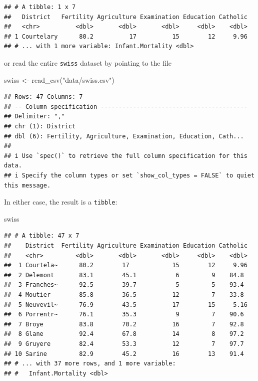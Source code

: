 \documentclass[
  12pt,
]{style/krantz}
\newenvironment{Shaded}{\begin{snugshade}}{\end{snugshade}}
\newcommand{\FunctionTok}[1]{\textcolor[rgb]{0.00,0.00,0.00}{#1}}
\newcommand{\NormalTok}[1]{#1}
\newcommand{\OtherTok}[1]{\textcolor[rgb]{0.56,0.35,0.01}{#1}}
\newcommand{\StringTok}[1]{\textcolor[rgb]{0.31,0.60,0.02}{#1}}
\begin{document}
\begin{verbatim}
## # A tibble: 1 x 7
##   District   Fertility Agriculture Examination Education Catholic
##   <chr>          <dbl>       <dbl>       <dbl>     <dbl>    <dbl>
## 1 Courtelary      80.2          17          15        12     9.96
## # ... with 1 more variable: Infant.Mortality <dbl>
\end{verbatim}

or read the entire \texttt{swiss} dataset by pointing to the file

\begin{Shaded}
\begin{Highlighting}[]
\NormalTok{swiss }\OtherTok{\textless{}{-}} \FunctionTok{read\_csv}\NormalTok{(}\StringTok{"data/swiss.csv"}\NormalTok{)}
\end{Highlighting}
\end{Shaded}

\begin{verbatim}
## Rows: 47 Columns: 7
## -- Column specification -----------------------------------------
## Delimiter: ","
## chr (1): District
## dbl (6): Fertility, Agriculture, Examination, Education, Cath...
## 
## i Use `spec()` to retrieve the full column specification for this data.
## i Specify the column types or set `show_col_types = FALSE` to quiet this message.
\end{verbatim}

In either case, the result is a \texttt{tibble}:

\begin{Shaded}
\begin{Highlighting}[]
\NormalTok{swiss}
\end{Highlighting}
\end{Shaded}

\begin{verbatim}
## # A tibble: 47 x 7
##    District  Fertility Agriculture Examination Education Catholic
##    <chr>         <dbl>       <dbl>       <dbl>     <dbl>    <dbl>
##  1 Courtela~      80.2        17            15        12     9.96
##  2 Delemont       83.1        45.1           6         9    84.8 
##  3 Franches~      92.5        39.7           5         5    93.4 
##  4 Moutier        85.8        36.5          12         7    33.8 
##  5 Neuvevil~      76.9        43.5          17        15     5.16
##  6 Porrentr~      76.1        35.3           9         7    90.6 
##  7 Broye          83.8        70.2          16         7    92.8 
##  8 Glane          92.4        67.8          14         8    97.2 
##  9 Gruyere        82.4        53.3          12         7    97.7 
## 10 Sarine         82.9        45.2          16        13    91.4 
## # ... with 37 more rows, and 1 more variable:
## #   Infant.Mortality <dbl>
\end{verbatim}
\end{document}
